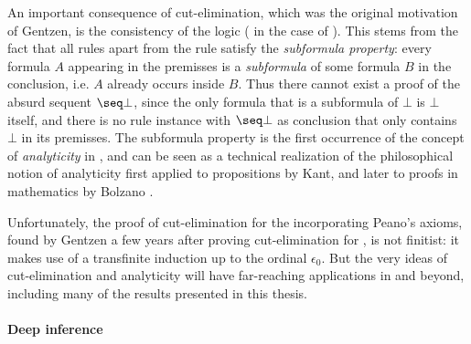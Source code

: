 An important consequence of cut-elimination, which was the original motivation
of Gentzen, is the consistency of the logic (  in the case of ). This stems from the fact that all rules apart
from the  rule satisfy the \emph{subformula property}: every formula $A$
appearing in the premisses is a \emph{subformula} of some formula $B$ in the
conclusion, i.e. $A$ already occurs inside $B$. Thus there cannot exist a proof
of the absurd sequent $\seq \bot$, since the only formula that is a subformula
of $\bot$ is $\bot$ itself, and there is no rule instance with $\seq \bot$ as
conclusion that only contains $\bot$ in its premisses. The subformula property
is the first occurrence of the concept of \emph{analyticity} in , and can be seen as a technical realization of the philosophical notion
of analyticity first applied to propositions by Kant, and later to proofs in
mathematics by Bolzano .

Unfortunately, the proof of cut-elimination for the 
incorporating Peano's axioms, found by Gentzen a few years after proving
cut-elimination for  , is
not finitist: it makes use of a transfinite induction up to the ordinal
$\epsilon_0$. But the very ideas of cut-elimination and analyticity will have
far-reaching applications in  and beyond, including many of the
results presented in this thesis.

\paragraph{Deep inference}

